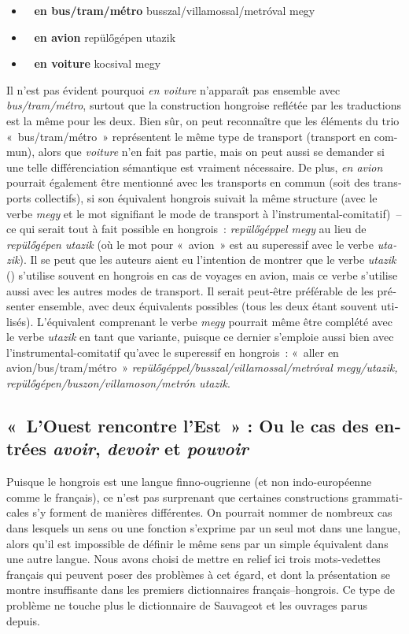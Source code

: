\documentclass[output=paper,colorlinks,citecolor=brown,arabicfont,chinesefont,booklanguage=french]{langscibook}
\begin{document}
\begin{otherlanguage}{french}
\begin{itemize}
    \item~ \textbf{en bus/tram/métro} busszal/villamossal/metróval megy
    \item~ \textbf{en avion} repülőgépen utazik
    \item~ \textbf{en voiture} kocsival megy
\end{itemize}

Il n’est pas évident pourquoi \emph{en voiture} n’apparaît pas ensemble avec \emph{bus/tram/métro}, surtout que la construction hongroise reflétée par les traductions est la même pour les deux. Bien sûr, on peut reconnaître que les éléments du trio «~bus/tram/métro~» représentent le même type de transport (transport en commun), alors que \emph{voiture} n’en fait pas partie, mais on peut aussi se demander si une telle différenciation sémantique est vraiment nécessaire. De plus, \emph{en avion} pourrait également être mentionné avec les transports en commun (soit des transports collectifs), si son équivalent hongrois suivait la même structure (avec le verbe \emph{megy} et le mot signifiant le mode de transport à l’instrumental-comitatif)~-- ce qui serait tout à fait possible en hongrois~: \emph{repülőgéppel megy} au lieu de \emph{repülőgépen utazik} (où le mot pour «~avion~» est au superessif avec le verbe \emph{utazik}). Il se peut que les auteurs aient eu l’intention de montrer que le verbe \emph{utazik} () s’utilise souvent en hongrois en cas de voyages en avion, mais ce verbe s’utilise aussi avec les autres modes de transport. Il serait peut-être préférable de les présenter ensemble, avec deux équivalents possibles (tous les deux étant souvent utilisés). L’équivalent comprenant le verbe \emph{megy} pourrait même être complété avec le verbe \emph{utazik} en tant que variante, puisque ce dernier s’emploie aussi bien avec l’instrumental-comitatif qu’avec le superessif en hongrois~: «~aller en avion/bus/tram/métro~» \emph{repülőgéppel/busszal/villamossal/metróval megy/utazik, repülőgépen/buszon/villamoson/metrón utazik}.

\subsection{«~L’Ouest rencontre l’Est~» : Ou le cas des entrées \emph{avoir}, \emph{devoir} et \emph{pouvoir}}\label{sec:tillinger:3.11}

Puisque le hongrois est une langue finno-ougrienne (et non indo-européenne comme le français), ce n’est pas surprenant que certaines constructions grammaticales s’y forment de manières différentes. On pourrait nommer de nombreux cas dans lesquels un sens ou une fonction s’exprime par un seul mot dans une langue, alors qu’il est impossible de définir le même sens par un simple équivalent dans une autre langue. Nous avons choisi de mettre en relief ici trois mots-vedettes français qui peuvent poser des problèmes à cet égard, et dont la présentation se montre insuffisante dans les premiers dictionnaires français–hongrois. Ce type de problème ne touche plus le dictionnaire de Sauvageot et les ouvrages parus depuis.


\end{otherlanguage}
\end{document}
